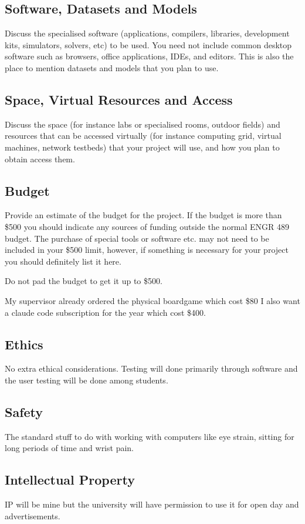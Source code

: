 \documentclass[11pt, a4paper, twoside, openright]{article}
\begin{document}
	\subsection{Software, Datasets and Models}
	
	Discuss the specialised software (applications, compilers, libraries, development kits, simulators, solvers, etc) to be used. You need not include common desktop software such as browsers, office applications, IDEs, and editors. This is also the place to mention datasets and models that you plan to use. 
	
	\subsection{Space, Virtual Resources and Access}
	
	Discuss the space (for instance labs or specialised rooms, outdoor fields) and resources that can be accessed virtually (for instance computing grid, virtual machines, network testbeds) that your project will use, and how you plan to obtain access them. 
	
	\subsection{Budget}
	
	Provide an estimate of the budget for the project. If the budget is more than \$500 you should indicate any sources of funding outside the normal ENGR 489 budget. The purchase of special tools or software etc. may not need to be included in your \$500 limit, however, if something is necessary for your project you should definitely list it here.
	
	Do not pad the budget to get it up to \$500.
	
	My supervisor already ordered the physical boardgame which cost \$80
	I also want a claude code subscription for the year which cost \$400.
		
	
	\subsection{Ethics}
	
	No extra ethical considerations. Testing will done primarily through software and the user testing will be done among students.
	
	\subsection{Safety}
	
	The standard stuff to do with working with computers like eye strain, sitting for long periods of time and wrist pain.
	
	
	\subsection{Intellectual Property}
	
	IP will be mine but the university will have permission to use it for open day and advertisements.
	
\end{document}
